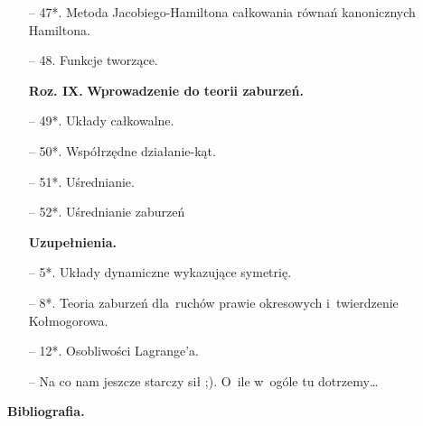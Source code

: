 \documentclass[a4paper,11pt]{article}
\begin{document}
\begin{itemize}
\item[--] 47*. Metoda Jacobiego-Hamiltona całkowania równań
  kanonicznych Hamiltona.

\item[--] 48. Funkcje tworzące.


\item[\textbf{Roz. IX.}] \textbf{Wprowadzenie do teorii zaburzeń.}

\item[--] 49*. Układy całkowalne.

\item[--] 50*. Współrzędne działanie-kąt.

\item[--] 51*. Uśrednianie.

\item[--] 52*. Uśrednianie zaburzeń


\item[] \textbf{Uzupełnienia.}

\item[--] 5*. Układy dynamiczne wykazujące symetrię.

\item[--] 8*. Teoria zaburzeń dla~ruchów prawie okresowych
  i~twierdzenie Kołmogorowa.

\item[--] 12*. Osobliwości Lagrange'a.

\item[--] Na co nam jeszcze starczy sił ;). O~ile w~ogóle tu
  dotrzemy\ldots

\end{itemize}



\begin{center}

  \Large{\textbf{Bibliografia.}}

\end{center}
\end{document}
